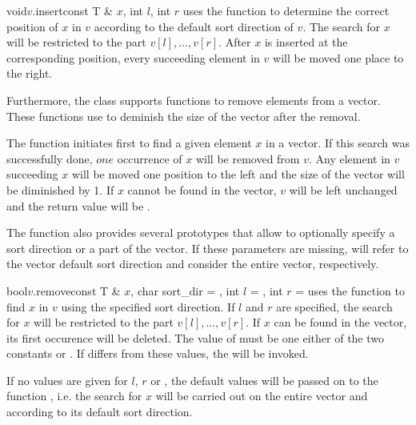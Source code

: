 \begin{fcode}{void}{$v$.insert}{const T & $x$, int $l$, int $r$}
  uses the function  to determine the correct position of $x$ in $v$
  according to the default sort direction of $v$.  The search for $x$ will be restricted to the
  part $v[l], \dots, v[r]$.  After $x$ is inserted at the corresponding position, every succeeding
  element in $v$ will be moved one place to the right.
\end{fcode}




Furthermore, the class  supports functions to remove elements from a
vector.  These functions use  to deminish the size of the vector after the
removal.

The function  initiates  first to find a given element $x$ in
a vector.  If this search was successfully done, $one$ occurrence of $x$ will be removed from
$v$.  Any element in $v$ succeeding $x$ will be moved one position to the left and the size of
the vector will be diminished by 1.  If $x$ cannot be found in the vector, $v$ will be left
unchanged and the return value will be \FALSE.

The function  also provides several prototypes that allow to optionally specify a
sort direction or a part of the vector.  If these parameters are missing,  will
refer to the vector default sort direction and consider the entire vector, respectively.

\begin{fcode}{bool}{$v$.remove}{const T & $x$, char sort_dir = \DEF, int $l$ = \DEF, int $r$ = \DEF}
  uses the function  to find $x$ in $v$ using the specified sort direction.
  If $l$ and $r$ are specified, the search for $x$ will be restricted to the part
  $v[l], \dots, v[r]$.  If $x$ can be found in the vector, its first occurence will be deleted.
  The value of  must be one either of the two constants 
  or .  If  differs from these values, the \LEH will be
  invoked.
  
  If no values are given for $l$, $r$ or , the default values will be passed on
  to the function , i.e. the search for $x$ will be carried out on the entire
  vector and according to its default sort direction.
\end{fcode}

